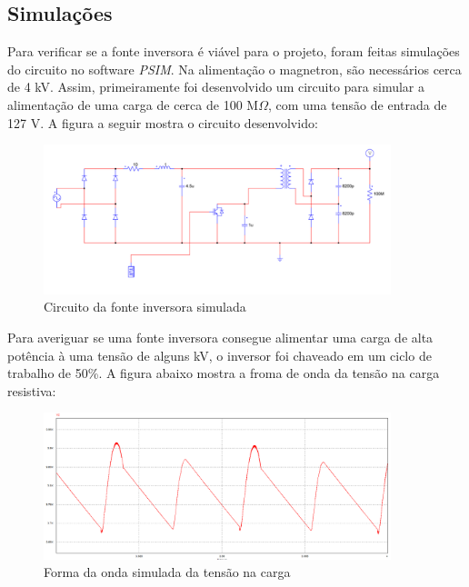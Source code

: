 \subsection{Simulações}
\label{sec:simulations}

Para verificar se a fonte inversora é viável para o projeto, foram feitas simulações do circuito no software \textit{PSIM}. Na alimentação o magnetron, são necessários cerca de 4 kV. Assim, primeiramente foi desenvolvido um circuito para simular a alimentação de uma carga de cerca de 100 M$\Omega$, com uma tensão de entrada de 127 V. A figura a seguir mostra o circuito desenvolvido:

\begin{figure}[!htb]
    \centering
    \includegraphics[width=0.9\textwidth]{./dados/figuras/psim1}
    \caption{Circuito da fonte inversora simulada}
    \label{fig:circ_sim_1}
\end{figure}

Para averiguar se uma fonte inversora consegue alimentar uma carga de alta potência à uma tensão de alguns kV, o inversor foi chaveado em um ciclo de trabalho de 50\%. A figura abaixo mostra a froma de onda da tensão na carga resistiva:

\begin{figure}[!htb]
    \centering
    \includegraphics[width=0.9\textwidth]{./dados/figuras/psim2}
    \caption{Forma da onda simulada da tensão na carga}
    \label{fig:figura-graf_sim_1}
\end{figure}

